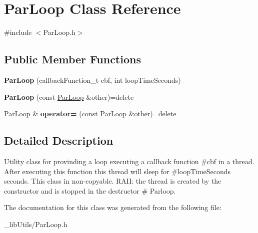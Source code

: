 \hypertarget{class_par_loop}{}\section{Par\+Loop Class Reference}
\label{class_par_loop}


{\ttfamily \#include $<$Par\+Loop.\+h$>$}

\subsection*{Public Member Functions}
\begin{DoxyCompactItemize}
\item 
\mbox{\label{class_par_loop_a78f2321aed1f6b23a7c1c96c9af657c8}} 
{\bfseries Par\+Loop} (callback\+Function\+\_\+t cbf, int loop\+Time\+Seconds)
\item 
\mbox{\label{class_par_loop_ace74578d6a178d281c088404c3e3c5c3}} 
{\bfseries Par\+Loop} (const \mbox{\hyperlink{class_par_loop}{Par\+Loop}} \&other)=delete
\item 
\mbox{\label{class_par_loop_a08a4587dc3f97fd0bbb6e9d3919565d2}} 
\mbox{\hyperlink{class_par_loop}{Par\+Loop}} \& {\bfseries operator=} (const \mbox{\hyperlink{class_par_loop}{Par\+Loop}} \&other)=delete
\end{DoxyCompactItemize}


\subsection{Detailed Description}
Utility class for provinding a loop executing a callback function \#cbf in a thread. After executing this function this thread will sleep for \#loop\+Time\+Seconds seconds. This class in non-\/copyable. R\+A\+II\+: the thread is created by the constructor and is stopped in the destructor \# Parloop. 

The documentation for this class was generated from the following file\+:\begin{DoxyCompactItemize}
\item 
\+\_\+lib\+Utils/Par\+Loop.\+h\end{DoxyCompactItemize}

